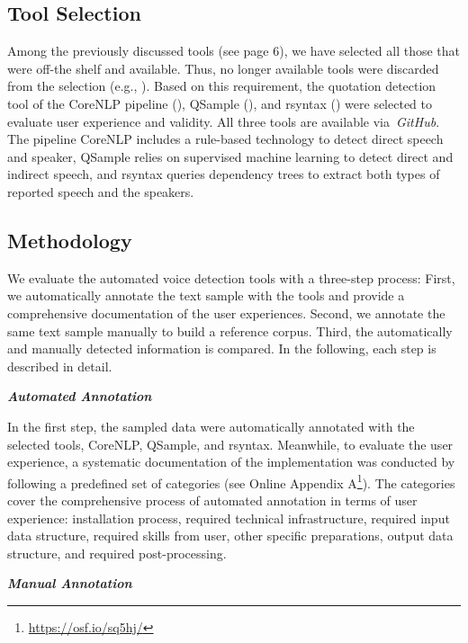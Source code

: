 \documentclass{ccr}
\begin{document}
\subsection{Tool Selection}Among the previously discussed tools (see page 6), we have selected all
those that were off-the shelf and available. Thus, no longer available
tools were discarded from the selection (e.g., \cite{elson2010automatic, krestel2008minding, pareti2015attribution, pouliquen2007automatic}). Based on
this requirement, the quotation detection tool of the CoreNLP pipeline
(\cite{manning2014stanford}), QSample (\cite{scheible2016model}), and rsyntax
(\cite{welbers2021extracting}) were selected to evaluate user experience and
validity. All three tools are available via~\textit{GitHub}. The pipeline
CoreNLP includes a rule-based technology to detect direct speech and
speaker, QSample relies on supervised machine learning to detect direct and
indirect speech, and rsyntax queries dependency trees to extract both types of reported speech and the speakers.
\subsection{Methodology}We evaluate the automated voice detection tools with a three-step
process: First, we automatically annotate the text sample with the tools
and provide a comprehensive documentation of the user experiences.
Second, we annotate the same text sample manually to build a reference
corpus. Third, the automatically and manually detected information is
compared. In the following, each step is described in detail.

\textit{\textbf{Automated Annotation}}

In the first step, the sampled data were automatically annotated with
the selected tools, CoreNLP, QSample, and rsyntax. Meanwhile, to
evaluate the user experience, a systematic documentation of the
implementation was conducted by following a predefined set of categories (see Online Appendix A\footnote{\url{https://osf.io/sq5hj/}}). The categories cover the comprehensive process of automated annotation in terms of user experience: installation process, required technical infrastructure, required input data structure, required skills from user, other specific preparations, output data structure, and required post-processing.

\textit{\textbf{Manual Annotation}}
\end{document}
